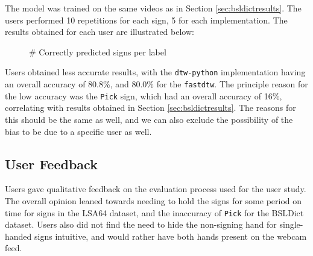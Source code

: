 \documentclass[final,rdr32.tex]{subfiles}
\begin{document}
The model was trained on the same videos as in Section \ref{sec:bsldictresults}. The users performed 10 repetitions for each sign, 5 for each implementation. The results obtained for each user are illustrated below:

\begin{figure}[H]
    \begin{center}
    \end{center}
    \caption{\# Correctly predicted signs per label}
    \label{bar:bsldictuser}
\end{figure}

Users obtained less accurate results, with the \verb|dtw-python| implementation having an overall accuracy of 80.8\%, and 80.0\% for the \verb|fastdtw|. The principle reason for the low accuracy was the \verb|Pick| sign, which had an overall accuracy of 16\%, correlating with results obtained in Section \ref{sec:bsldictresults}. The reasons for this should be the same as well, and we can also exclude the possibility of the bias to be due to a specific user as well.

\subsection{User Feedback}

Users gave qualitative feedback on the evaluation process used for the user study. The overall opinion leaned towards needing to hold the signs for some period on time for signs in the LSA64 dataset, and the inaccuracy of \verb|Pick| for the BSLDict dataset. Users also did not find the need to hide the non-signing hand for single-handed signs intuitive, and would rather have both hands present on the webcam feed.
\end{document}
